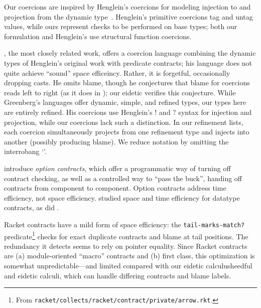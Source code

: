 \documentclass[9pt]{extarticle}
\begin{document}
Our coercions are inspired by Henglein's coercions for modeling
injection to and projection from the dynamic
type~\cite{Henglein94dynamic}. Henglein's primitive coercions tag and
untag values, while ours represent checks to be performed on base
types; both our formulation and Henglein's use structural function
coercions.

\citet{Greenberg13thesis}, the most closely related work, offers a
coercion language combining the dynamic types of Henglein's original
work with predicate contracts; his \Efficient language does not quite
achieve ``sound'' space efficeincy. Rather, it is forgetful,
occasionally dropping casts. He omits blame, though he conjectures
that blame for coercions reads left to right (as it does in
\citet{Siek12interpretations}); our eidetic \lambdah verifies this
conjecture.
While Greenberg's languages offer dynamic, simple, and refined types,
our types here are entirely refined. His coercions use Henglein's $!$
and $?$ syntax for injection and projection, while our coercions lack
such a distinction. In our refinement lists, each coercion
simultaneously projects from one refinement type and injects into
another (possibly producing blame). We reduce notation by omitting the
interrobang `\interrobang'.


 introduce \textit{option contracts}, which
offer a programmatic way of turning off contract checking, as well as
a controlled way to ``pass the buck'', handing off contracts from
component to component. Option contracts address time efficiency, not space efficiency.
 studied space and time efficiency for
datatype contracts, as did \citet{Koukoutos14data}.

Racket contracts have a mild form of space efficiency: the
\texttt{tail-marks-match?} predicate\footnote{From
  \texttt{racket/collects/racket/contract/private/arrow.rkt}.} checks
for exact duplicate contracts and blame at tail positions. The redundancy it
detects seems to rely on pointer equality. Since Racket contracts
are (a) module-oriented ``macro'' contracts and (b) first class, this
optimization is somewhat unpredictable---and limited compared with our
\ifpopl eidetic calculus\else heedful and eidetic calculi\fi, which can
handle differing contracts and blame labels.
\end{document}
